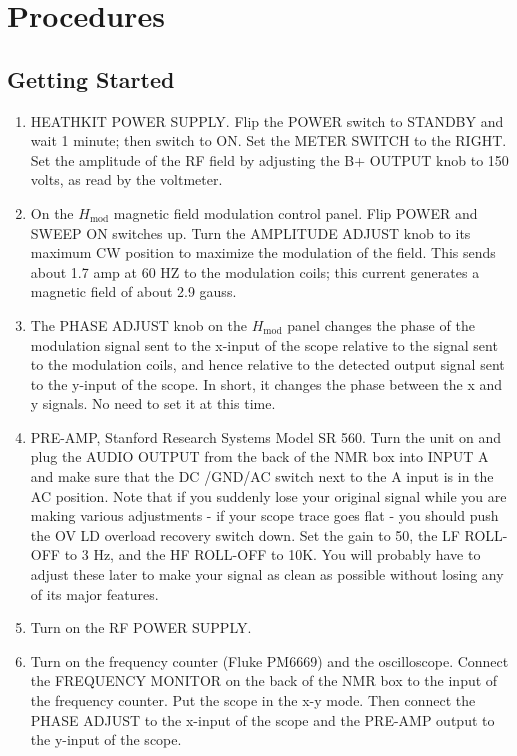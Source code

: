 \documentclass{../lab}
\begin{document}
\section{Procedures}

\subsection{Getting Started}

\begin{enumerate}
    \item HEATHKIT POWER SUPPLY. Flip the POWER switch to STANDBY and wait 1 minute; then switch to ON. Set the METER SWITCH to the RIGHT. Set the amplitude of the RF field by adjusting the B+ OUTPUT knob to 150 volts, as read by the voltmeter.

    \item On the $H_\text{mod}$ magnetic field modulation control panel. Flip POWER and SWEEP ON switches up. Turn the AMPLITUDE ADJUST knob to its maximum CW position to maximize the modulation of the field. This sends about 1.7 amp at 60 HZ to the modulation coils; this current generates a magnetic field of about 2.9 gauss.

    \item The PHASE ADJUST knob on the $H_\text{mod}$ panel changes the phase of the modulation signal sent to the x-input of the scope relative to the signal sent to the modulation coils, and hence relative to the detected output signal sent to the y-input of the scope. In short, it changes the phase between the x and y signals. No need to set it at this time.

    \item PRE-AMP, Stanford Research Systems Model SR 560. Turn the unit on and plug the AUDIO OUTPUT from the back of the NMR box into INPUT A and make sure that the DC /GND/AC switch next to the A input is in the AC position. Note that if you suddenly lose your original signal while you are making various adjustments - if your scope trace goes flat - you should push the OV LD overload recovery switch down. Set the gain to 50, the LF ROLL-OFF to 3 Hz, and the HF ROLL-OFF to 10K. You will probably have to adjust these later to make your signal as clean as possible without losing any of its major features.

    \item Turn on the RF POWER SUPPLY.

    \item Turn on the frequency counter (Fluke PM6669) and the oscilloscope. Connect the FREQUENCY MONITOR on the back of the NMR box to the input of the frequency counter. Put the scope in the x-y mode. Then connect the PHASE ADJUST to the x-input of the scope and the PRE-AMP output to the y-input of the scope.


\end{enumerate}
\end{document}

